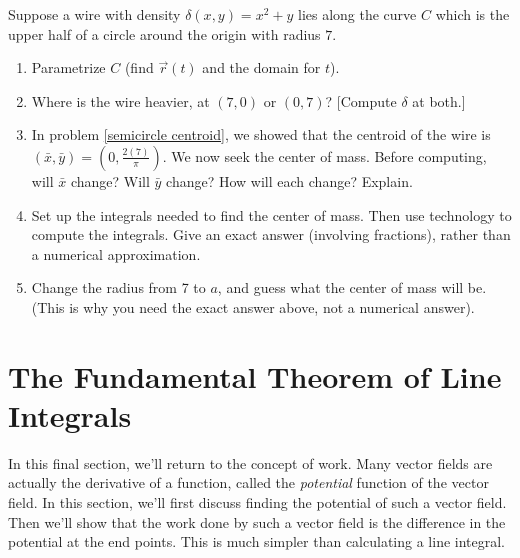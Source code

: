\begin{problem}
%
Suppose a wire with density $\delta(x,y)=x^2+y$ lies along the curve $C$ which is the upper half of a circle around the origin with radius $7$.
\begin{enumerate}
\item Parametrize $C$ (find $\vec r(t)$ and the domain for $t$).
 \item Where is the wire heavier, at $(7,0)$ or $(0,7)$? [Compute $\delta$ at both.]
 \item In problem \ref{semicircle centroid}, we showed that the centroid of the wire is $(\bar x, \bar y) = \left(0,\frac{2(7)}{\pi}\right)$.  We now seek the center of mass. Before computing, will $\bar x$ change?  Will $\bar y$ change?  How will each change? Explain.
 \item Set up the integrals needed to find the center of mass. Then use technology to compute the integrals. Give an exact answer (involving fractions), rather than a numerical approximation.
 \item Change the radius from 7 to $a$, and guess what the center of mass will be.  (This is why you need the exact answer above, not a numerical answer).
\end{enumerate}
\end{problem}


















\section{The Fundamental Theorem of Line Integrals}

In this final section, we'll return to the concept of work. Many vector fields are actually the derivative of a function, called the \emph{potential} function of the vector field.  In this section, we'll first discuss finding the potential of such a vector field.  Then we'll show that the work done by such a vector field is the difference in the potential at the end points.  This is much simpler than calculating a line integral.

